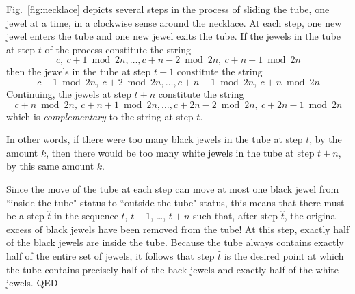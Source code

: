 \documentclass{article}
\begin{document}
Fig.~\ref{fig:necklace} depicts several steps in the process of sliding the tube, one jewel at a time, in a clockwise sense around the necklace.  At each step, one new jewel enters the tube and one new jewel exits the tube.  If the jewels in the tube at step $t$ of the process constitute the string
\[ c, \ c+1 \bmod 2n, \ldots,  c+n-2 \bmod 2n, \ c+n-1 \bmod 2n \]
then the jewels in the tube at step $t+1$ constitute the string
\[ c+1 \bmod 2n,  \ c+2 \bmod 2n, \ldots,  c+n-1 \bmod 2n , \ c+n \bmod 2n \]
Continuing, the jewels at step $t + n$ constitute the string
\[ c+n \bmod 2n, \ c+n+1 \bmod 2n,   \ldots,  c+ 2n-2 \bmod 2n , \ c+2n-1 \bmod 2n \]
which is {\em complementary} to the string at step $t$.

\smallskip

In other words, if there were too many black jewels in the tube at step $t$, by the amount $k$, then there would be too many white jewels in the tube at step $t+n$, by this same amount $k$.

\smallskip

Since the move of the tube at each step can move at most one black jewel from ``inside the tube" status to ``outside the tube" status, this means that there must be a step $\hat{t}$ in the sequence $t$, $t+1$, \ldots, $t+n$ such that, after step $\hat{t}$, the original excess of black jewels have been removed from the tube!  At this step, exactly half of the black jewels are inside the tube.  Because the tube always contains exactly half of the entire set of jewels, it follows that step $\hat{t}$ is the desired point at which the tube contains precisely half of the back jewels and exactly half of the white jewels.  QED
\end{document}
